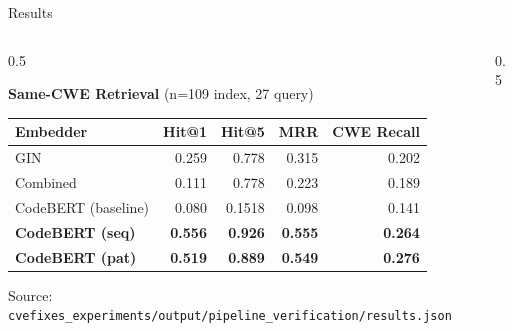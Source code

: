 \documentclass[aspectratio=169,10pt]{beamer}
\newcommand{\cmiss}[1]{\cellcolor{miss!25} #1}
\begin{document}
\begin{frame}{Results}

  \begin{columns}[T]
    \begin{column}{0.5\textwidth}

  \begin{center}
    {\small\textbf{Same-CWE Retrieval} {\scriptsize(n=109 index, 27 query)}}\\[6pt]
  {\scriptsize
  \renewcommand{\arraystretch}{1.35}
  \setlength{\tabcolsep}{3.5pt}
    \begin{tabular}{lrrrr}
      \toprule
      \textbf{Embedder} & \textbf{Hit@1} & \textbf{Hit@5} & \textbf{MRR} & \textbf{CWE Recall} \\
      \midrule
      GIN & 0.259 & 0.778 & 0.315 & 0.202 \\
      \rowcolor{warn!12}
      Combined & \cmiss{0.111} & 0.778 & 0.223 & 0.189 \\
      CodeBERT (baseline) & 0.080 & 0.1518 & 0.098 & 0.141 \\
      \rowcolor{hit!12}
      \textbf{CodeBERT (seq)} & \textbf{0.556} & \textbf{0.926} & \textbf{0.555} & \textbf{0.264} \\
      \textbf{CodeBERT (pat)} & \textbf{0.519} & \textbf{0.889} & \textbf{0.549} & \textbf{0.276} \\
      \bottomrule
    \end{tabular}
  }

  \vspace{0.3em}
  {\tiny\textcolor{notecol}{Source: \texttt{cvefixes\_experiments/output/pipeline\_verification/results.json}}}

  
  \end{center}
  
    \end{column}
    \begin{column}{0.5\textwidth}


\end{column}
\end{columns}
\end{frame}
\end{document}
